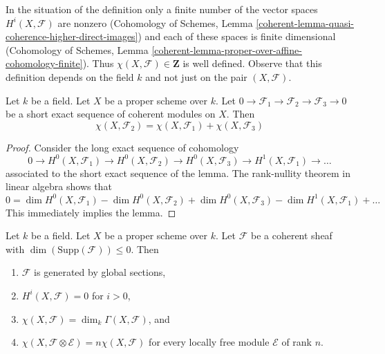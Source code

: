 \noindent
In the situation of the definition only a finite number of the vector spaces
$H^i(X, \mathcal{F})$ are nonzero (Cohomology of Schemes, Lemma
\ref{coherent-lemma-quasi-coherence-higher-direct-images})
and each of these spaces is finite dimensional
(Cohomology of Schemes, Lemma
\ref{coherent-lemma-proper-over-affine-cohomology-finite}). Thus
$\chi(X, \mathcal{F}) \in \mathbf{Z}$ is well defined. Observe that
this definition depends on the field $k$ and not just on the pair
$(X, \mathcal{F})$.

\begin{lemma}
\label{lemma-euler-characteristic-additive}
Let $k$ be a field. Let $X$ be a proper scheme over $k$.
Let $0 \to \mathcal{F}_1 \to \mathcal{F}_2 \to \mathcal{F}_3 \to 0$
be a short exact sequence of coherent modules on $X$. Then
$$
\chi(X, \mathcal{F}_2) = \chi(X, \mathcal{F}_1) + \chi(X, \mathcal{F}_3)
$$
\end{lemma}

\begin{proof}
Consider the long exact sequence of cohomology
$$
0 \to H^0(X, \mathcal{F}_1) \to H^0(X, \mathcal{F}_2) \to
H^0(X, \mathcal{F}_3) \to H^1(X, \mathcal{F}_1) \to \ldots
$$
associated to the short exact sequence of the lemma. The rank-nullity theorem
in linear algebra shows that
$$
0 = \dim H^0(X, \mathcal{F}_1) - \dim H^0(X, \mathcal{F}_2)
+ \dim H^0(X, \mathcal{F}_3) - \dim H^1(X, \mathcal{F}_1) + \ldots
$$
This immediately implies the lemma.
\end{proof}

\begin{lemma}
\label{lemma-chi-tensor-finite}
Let $k$ be a field. Let $X$ be a proper scheme over $k$. Let $\mathcal{F}$
be a coherent sheaf with $\dim(\text{Supp}(\mathcal{F})) \leq 0$.
Then
\begin{enumerate}
\item $\mathcal{F}$ is generated by global sections,
\item $H^i(X, \mathcal{F}) = 0$ for $i > 0$,
\item $\chi(X, \mathcal{F}) = \dim_k\Gamma(X, \mathcal{F})$, and
\item
$\chi(X, \mathcal{F} \otimes \mathcal{E}) = n\chi(X, \mathcal{F})$
for every locally free module $\mathcal{E}$ of rank $n$.
\end{enumerate}
\end{lemma}

